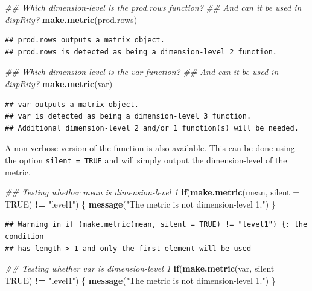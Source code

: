 \documentclass[]{book}
\newenvironment{Shaded}{\begin{snugshade}}{\end{snugshade}}
\newcommand{\CommentTok}[1]{\textcolor[rgb]{0.56,0.35,0.01}{\textit{#1}}}
\newcommand{\ControlFlowTok}[1]{\textcolor[rgb]{0.13,0.29,0.53}{\textbf{#1}}}
\newcommand{\DataTypeTok}[1]{\textcolor[rgb]{0.13,0.29,0.53}{#1}}
\newcommand{\KeywordTok}[1]{\textcolor[rgb]{0.13,0.29,0.53}{\textbf{#1}}}
\newcommand{\NormalTok}[1]{#1}
\newcommand{\OperatorTok}[1]{\textcolor[rgb]{0.81,0.36,0.00}{\textbf{#1}}}
\newcommand{\OtherTok}[1]{\textcolor[rgb]{0.56,0.35,0.01}{#1}}
\newcommand{\StringTok}[1]{\textcolor[rgb]{0.31,0.60,0.02}{#1}}
\begin{document}
\begin{Shaded}
\begin{Highlighting}[]
\CommentTok{## Which dimension-level is the prod.rows function?}
\CommentTok{## And can it be used in dispRity?}
\KeywordTok{make.metric}\NormalTok{(prod.rows)}
\end{Highlighting}
\end{Shaded}

\begin{verbatim}
## prod.rows outputs a matrix object.
## prod.rows is detected as being a dimension-level 2 function.
\end{verbatim}

\begin{Shaded}
\begin{Highlighting}[]
\CommentTok{## Which dimension-level is the var function?}
\CommentTok{## And can it be used in dispRity?}
\KeywordTok{make.metric}\NormalTok{(var)}
\end{Highlighting}
\end{Shaded}

\begin{verbatim}
## var outputs a matrix object.
## var is detected as being a dimension-level 3 function.
## Additional dimension-level 2 and/or 1 function(s) will be needed.
\end{verbatim}

A non verbose version of the function is also available.
This can be done using the option \texttt{silent\ =\ TRUE} and will simply output the dimension-level of the metric.

\begin{Shaded}
\begin{Highlighting}[]
\CommentTok{## Testing whether mean is dimension-level 1}
\ControlFlowTok{if}\NormalTok{(}\KeywordTok{make.metric}\NormalTok{(mean, }\DataTypeTok{silent =} \OtherTok{TRUE}\NormalTok{) }\OperatorTok{!=}\StringTok{ "level1"}\NormalTok{) \{}
    \KeywordTok{message}\NormalTok{(}\StringTok{"The metric is not dimension-level 1."}\NormalTok{)}
\NormalTok{\}}
\end{Highlighting}
\end{Shaded}

\begin{verbatim}
## Warning in if (make.metric(mean, silent = TRUE) != "level1") {: the condition
## has length > 1 and only the first element will be used
\end{verbatim}

\begin{Shaded}
\begin{Highlighting}[]
\CommentTok{## Testing whether var is dimension-level 1}
\ControlFlowTok{if}\NormalTok{(}\KeywordTok{make.metric}\NormalTok{(var, }\DataTypeTok{silent =} \OtherTok{TRUE}\NormalTok{) }\OperatorTok{!=}\StringTok{ "level1"}\NormalTok{) \{}
    \KeywordTok{message}\NormalTok{(}\StringTok{"The metric is not dimension-level 1."}\NormalTok{)}
\NormalTok{\}}
\end{Highlighting}
\end{Shaded}
\end{document}
